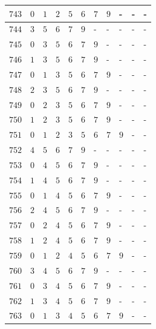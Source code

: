 \begin{appendices}
\begin{table}[H]
\begin{tabular} {|l|l|l|l|l|l|l|l|l|l|l|}
  		$ 743 $ & $ 0 $ &$ 1 $ &$ 2 $ &$ 5 $ &$ 6 $ &$ 7 $ &$ 9 $ & - &  - &  -   \\ \hline
  		$ 744 $ & $ 3 $ &$ 5 $ &$ 6 $ &$ 7 $ &$ 9 $ & - &  - &  - &  - &  -   \\ \hline
  		$ 745 $ & $ 0 $ &$ 3 $ &$ 5 $ &$ 6 $ &$ 7 $ &$ 9 $ & - &  - &  - &  -   \\ \hline
  		$ 746 $ & $ 1 $ &$ 3 $ &$ 5 $ &$ 6 $ &$ 7 $ &$ 9 $ & - &  - &  - &  -   \\ \hline
  		$ 747 $ & $ 0 $ &$ 1 $ &$ 3 $ &$ 5 $ &$ 6 $ &$ 7 $ &$ 9 $ & - &  - &  -   \\ \hline
  		$ 748 $ & $ 2 $ &$ 3 $ &$ 5 $ &$ 6 $ &$ 7 $ &$ 9 $ & - &  - &  - &  -   \\ \hline
  		$ 749 $ & $ 0 $ &$ 2 $ &$ 3 $ &$ 5 $ &$ 6 $ &$ 7 $ &$ 9 $ & - &  - &  -   \\ \hline
  		$ 750 $ & $ 1 $ &$ 2 $ &$ 3 $ &$ 5 $ &$ 6 $ &$ 7 $ &$ 9 $ & - &  - &  -   \\ \hline
  		$ 751 $ & $ 0 $ &$ 1 $ &$ 2 $ &$ 3 $ &$ 5 $ &$ 6 $ &$ 7 $ &$ 9 $ & - &  -   \\ \hline
  		$ 752 $ & $ 4 $ &$ 5 $ &$ 6 $ &$ 7 $ &$ 9 $ & - &  - &  - &  - &  -   \\ \hline
  		$ 753 $ & $ 0 $ &$ 4 $ &$ 5 $ &$ 6 $ &$ 7 $ &$ 9 $ & - &  - &  - &  -   \\ \hline
  		$ 754 $ & $ 1 $ &$ 4 $ &$ 5 $ &$ 6 $ &$ 7 $ &$ 9 $ & - &  - &  - &  -   \\ \hline
  		$ 755 $ & $ 0 $ &$ 1 $ &$ 4 $ &$ 5 $ &$ 6 $ &$ 7 $ &$ 9 $ & - &  - &  -   \\ \hline
  		$ 756 $ & $ 2 $ &$ 4 $ &$ 5 $ &$ 6 $ &$ 7 $ &$ 9 $ & - &  - &  - &  -   \\ \hline
  		$ 757 $ & $ 0 $ &$ 2 $ &$ 4 $ &$ 5 $ &$ 6 $ &$ 7 $ &$ 9 $ & - &  - &  -   \\ \hline
  		$ 758 $ & $ 1 $ &$ 2 $ &$ 4 $ &$ 5 $ &$ 6 $ &$ 7 $ &$ 9 $ & - &  - &  -   \\ \hline
  		$ 759 $ & $ 0 $ &$ 1 $ &$ 2 $ &$ 4 $ &$ 5 $ &$ 6 $ &$ 7 $ &$ 9 $ & - &  -   \\ \hline
  		$ 760 $ & $ 3 $ &$ 4 $ &$ 5 $ &$ 6 $ &$ 7 $ &$ 9 $ & - &  - &  - &  -   \\ \hline
  		$ 761 $ & $ 0 $ &$ 3 $ &$ 4 $ &$ 5 $ &$ 6 $ &$ 7 $ &$ 9 $ & - &  - &  -   \\ \hline
  		$ 762 $ & $ 1 $ &$ 3 $ &$ 4 $ &$ 5 $ &$ 6 $ &$ 7 $ &$ 9 $ & - &  - &  -   \\ \hline
  		$ 763 $ & $ 0 $ &$ 1 $ &$ 3 $ &$ 4 $ &$ 5 $ &$ 6 $ &$ 7 $ &$ 9 $ & - &  -   \\ \hline

\end{tabular}
\end{table}
\end{appendices}

